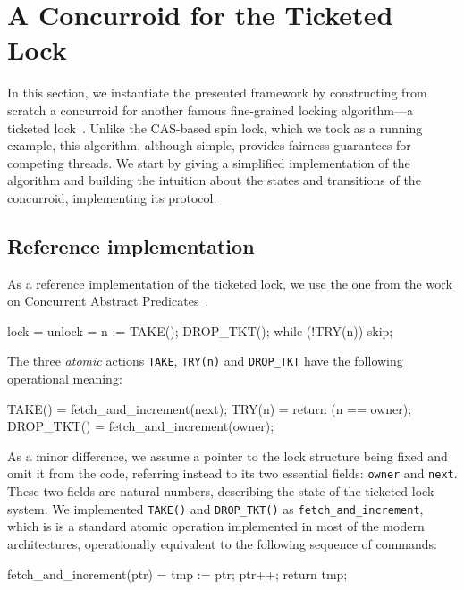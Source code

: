 
\section{A Concurroid for the Ticketed Lock}
\label{sec:ticketed}

In this section, we instantiate the presented framework by
constructing from scratch a concurroid for another famous fine-grained
locking algorithm---a ticketed lock~\cite{DinsdaleYoung-al:ECOOP10}.
Unlike the CAS-based spin lock, which we took as a running example,
this algorithm, although simple, provides fairness guarantees for
competing threads. We start by giving a simplified implementation of
the algorithm and building the intuition about the states and
transitions of the concurroid, implementing its protocol.

\subsection{Reference implementation}
\label{sec:refer-impl}

As a reference implementation of the ticketed lock, we use the one
from the work on Concurrent Abstract
Predicates~\cite{DinsdaleYoung-al:ECOOP10}. 

\begin{code}
 lock = {                        unlock = {
   n := TAKE();                   DROP_TKT();         
   while (!TRY(n)) skip;         }
 }  
\end{code} 

The three \emph{atomic} actions \texttt{TAKE}, \texttt{TRY(n)} and
\texttt{DROP\_TKT} have the following operational meaning:

\begin{code}
 TAKE()     = { fetch_and_increment(next); }
 TRY(n)     = { return (n == owner); }
 DROP_TKT() = { fetch_and_increment(owner); }  
\end{code} 

As a minor difference, we assume a pointer to the lock structure being
fixed and omit it from the code, referring instead to its two
essential fields: \texttt{owner} and \texttt{next}. These two fields
are natural numbers, describing the state of the ticketed lock system.
%
We implemented \texttt{TAKE()} and \texttt{DROP\_TKT()} as
\texttt{fetch\_and\_increment}, which is is a standard atomic operation
implemented in most of the modern architectures, operationally
equivalent to the following sequence of commands:

\begin{code}
 fetch_and_increment(ptr) = { tmp := ptr; ptr++; return tmp; }  
\end{code}


